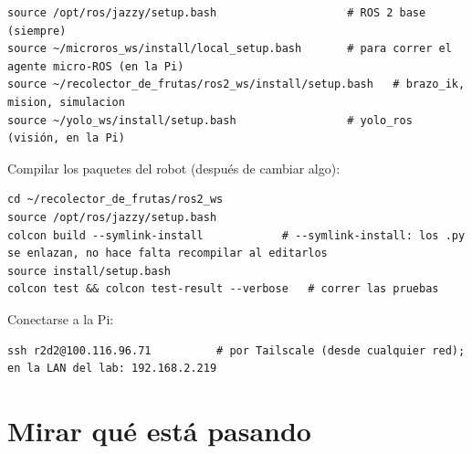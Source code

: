 \begin{lstlisting}[language=consola]
source /opt/ros/jazzy/setup.bash                    # ROS 2 base (siempre)
source ~/microros_ws/install/local_setup.bash       # para correr el agente micro-ROS (en la Pi)
source ~/recolector_de_frutas/ros2_ws/install/setup.bash   # brazo_ik, mision, simulacion
source ~/yolo_ws/install/setup.bash                 # yolo_ros (visión, en la Pi)
\end{lstlisting}

Compilar los paquetes del robot (después de cambiar algo):

\begin{lstlisting}[language=consola]
cd ~/recolector_de_frutas/ros2_ws
source /opt/ros/jazzy/setup.bash
colcon build --symlink-install            # --symlink-install: los .py se enlazan, no hace falta recompilar al editarlos
source install/setup.bash
colcon test && colcon test-result --verbose   # correr las pruebas
\end{lstlisting}

Conectarse a la Pi:
\begin{lstlisting}[language=consola]
ssh r2d2@100.116.96.71          # por Tailscale (desde cualquier red); en la LAN del lab: 192.168.2.219
\end{lstlisting}

\section{Mirar qué está pasando}

